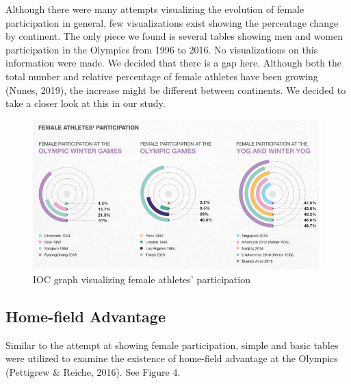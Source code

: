 \documentclass[12pt]{article}
\begin{document}
Although there were many attempts visualizing the evolution of female participation in general, few visualizations exist showing the percentage change by continent. The only piece we found is several tables showing men and women participation in the Olympics from 1996 to 2016. No visualizations on this information were made. We decided that there is a gap here. Although both the total number and relative percentage of female athletes have been growing (Nunes, 2019), the increase might be different between continents. We decided to take a closer look at this in our study. 
\begin{figure}[!b]
    \centering
    \includegraphics[scale=0.4]{pics/1-5.png}
    \caption{IOC graph visualizing female athletes' participation}
    \label{fig:my_label}
\end{figure}
\FloatBarrier %

\subsection{Home-field Advantage}
Similar to the attempt at showing female participation, simple and basic tables were utilized to examine the existence of home-field advantage at the Olympics (Pettigrew \& Reiche, 2016). See Figure 4.
\end{document}

